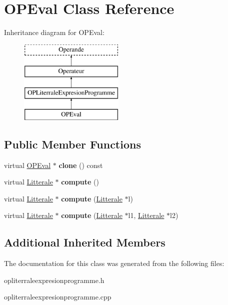 \hypertarget{class_o_p_eval}{}\section{O\+P\+Eval Class Reference}
\label{class_o_p_eval}
Inheritance diagram for O\+P\+Eval\+:\begin{figure}[H]
\begin{center}
\leavevmode
\includegraphics[height=4.000000cm]{class_o_p_eval}
\end{center}
\end{figure}
\subsection*{Public Member Functions}
\begin{DoxyCompactItemize}
\item 
virtual \hyperlink{class_o_p_eval}{O\+P\+Eval} $\ast$ {\bfseries clone} () const \hypertarget{class_o_p_eval_ad1cae68bb1b51dc285188fc40ca65bf0}{}\label{class_o_p_eval_ad1cae68bb1b51dc285188fc40ca65bf0}

\item 
virtual \hyperlink{class_litterale}{Litterale} $\ast$ {\bfseries compute} ()\hypertarget{class_o_p_eval_a9b077bf839d77d85391454c8013005b3}{}\label{class_o_p_eval_a9b077bf839d77d85391454c8013005b3}

\item 
virtual \hyperlink{class_litterale}{Litterale} $\ast$ {\bfseries compute} (\hyperlink{class_litterale}{Litterale} $\ast$l)\hypertarget{class_o_p_eval_ac6a1a4756b6e241fde8e39dab5b6f2f4}{}\label{class_o_p_eval_ac6a1a4756b6e241fde8e39dab5b6f2f4}

\item 
virtual \hyperlink{class_litterale}{Litterale} $\ast$ {\bfseries compute} (\hyperlink{class_litterale}{Litterale} $\ast$l1, \hyperlink{class_litterale}{Litterale} $\ast$l2)\hypertarget{class_o_p_eval_a8dc48ac8e0f5683ca743462c61bc68de}{}\label{class_o_p_eval_a8dc48ac8e0f5683ca743462c61bc68de}

\end{DoxyCompactItemize}
\subsection*{Additional Inherited Members}


The documentation for this class was generated from the following files\+:\begin{DoxyCompactItemize}
\item 
opliterraleexpresionprogramme.\+h\item 
opliterraleexpresionprogramme.\+cpp\end{DoxyCompactItemize}
